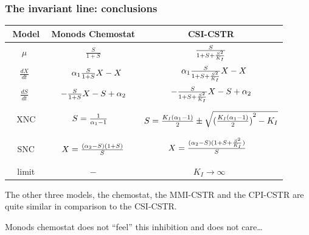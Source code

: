 \documentclass[a4paper, 10pt, twoside, openright]{book}
\begin{document}
\subsubsection*{The invariant line: conclusions}



\begin{tabular}{|c|c|c|} \hline %
$\phantom{\Bigg(}$Model$\phantom{\Bigg(}$ & Monods Chemostat & CSI-CSTR \\ 
\hline %
$\mu\phantom{\Bigg(}$
& $\frac{ S} {1+S}$
& $\frac{ S} {1+S+\frac{{S}^{2}}{{K}_{I}}}$ \\ %
$\frac{dX}{dt} \phantom{\Bigg(}$ 
& $\phantom{-}{\alpha}_{1}\frac{ S}{1+S}X-X$        
& $\phantom{-}{\alpha}_{1}\frac{ S}{1+S+\frac{{S}^{2}}{{K}_{I}}}X-X $  \\
$\frac{dS}{dt} \phantom{\Bigg)}$ 
& $-\frac{S} {1+S}X-S+{\alpha}_{2} $        
& $-\frac{S} {1+S+\frac{{S}^{2}}{{K}_{I}}}X-S+{\alpha}_{2}$        \\ %
XNC%
& $S=\frac{1}{{\alpha}_{1} - 1} \phantom{\Bigg(}$
& $S=\frac{{K}_{I}({\alpha}_{1}-1)}{2}\pm\sqrt{{(\frac{{K}_{I}({\alpha}_{1}-1)}{2})}^{2}-{K}_{I}}$ \\
SNC%
& $ X= \frac{ ({\alpha}_{2}-S)(1+S) }  { S }$ 
& $ X=
\frac{({\alpha}_{2}-S)(1+S+\frac{{S}^{2}}{{K}_{I}})}{S}\phantom{\Bigg(} $\\ 
limit%
& $-$
& $ K_I \rightarrow \infty\phantom{\Bigg(}$  \\ \hline 
\end{tabular}




The other three models, the chemostat, the MMI-CSTR and the CPI-CSTR
are quite similar in comparison to the CSI-CSTR. 

Monods chemostat does not ``feel'' this inhibition and does not care\ldots 


\end{document}
